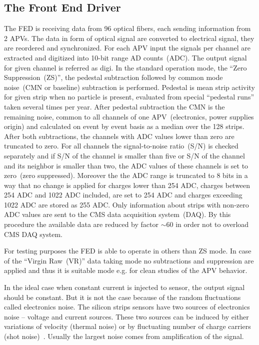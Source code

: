 
\subsection{The Front End Driver}


The FED is receiving data from 96 optical fibers, each sending information from 2 APVs. The data in form of optical signal are converted to electrical signal, they are reordered and synchronized. For each APV input the signals per channel are extracted and digitized into 10-bit range AD counts~(ADC). The output signal for given channel is referred as digi. In the standard operation mode, the ``Zero Suppression~(ZS)'', the pedestal subtraction followed by common mode noise~(CMN or baseline) subtraction is performed. Pedestal is mean strip activity for given strip when no particle is present, evaluated from special ``pedestal runs'' taken several times per year. After pedestal subtraction the CMN is the remaining noise, common to all channels of one APV~(electronics, power supplies origin) and calculated on event by event basis as a median over the 128 strips. After both subtractions, the channels with ADC values lower than zero are truncated to zero. For all channels the signal-to-noise ratio~(S/N) is checked separately and if S/N of the channel is smaller than five or S/N of the channel and its neighbor is smaller than two, the ADC values of these channels is set to zero~(zero suppressed). Moreover the the ADC range is truncated to 8 bits in a way that no change is applied for charges lower than 254 ADC, charges between 254 ADC and 1022 ADC included, are set to 254 ADC and charges exceeding 1022 ADC are stored as 255 ADC. Only information about strips with non-zero ADC values are sent to the CMS data acquisition system~(DAQ). By this procedure the available data are reduced by factor $\sim$60 in order not to overload CMS DAQ system.

For testing purposes the FED is able to operate in others than ZS mode. In case of the ``Virgin Raw~(VR)'' data taking mode no subtractions and suppression are applied and thus it is suitable mode e.g. for clean studies of the APV behavior.

In the ideal case when constant current is injected to sensor, the output signal should be constant. But it is not the case because of the random fluctuations called electronics noise. The silicon strips sensors have two sources of electronics noise -- voltage and current sources. These two sources can be induced by either variations of velocity (thermal noise) or by fluctuating number of charge carriers (shot noise)~\cite{website:noise}. Usually the largest noise comes from amplification of the signal. 

